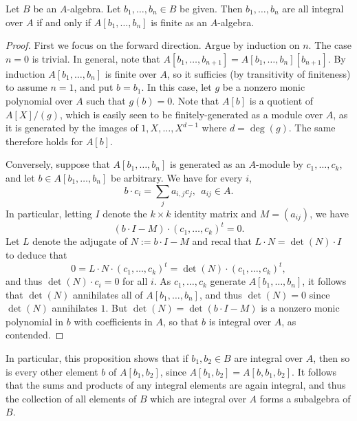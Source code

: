 \begin{proposition}
  Let $B$ be an $A$-algebra.
  Let $b_{1},\ldots,b_{n} \in B$ be given.
  Then $b_{1},\ldots,b_{n}$ are all integral over $A$ if and only if $A[b_{1},\ldots,b_{n}]$ is finite as an $A$-algebra.
\end{proposition}
\begin{proof}
  First we focus on the forward direction.
  Argue by induction on $n$.
  The case $n = 0$ is trivial.
  In general, note that $A[b_{1},\ldots,b_{n+1}] = A[b_{1},\ldots,b_{n}][b_{n+1}]$.
  By induction $A[b_{1},\ldots,b_{n}]$ is finite over $A$, so it sufficies (by transitivity of finiteness) to assume $n = 1$, and put $b = b_{1}$.
  In this case, let $g$ be a nonzero monic polynomial over $A$ such that $g(b) = 0$.
  Note that $A[b]$ is a quotient of $A[X]/(g)$, which is easily seen to be finitely-generated as a module over $A$, as it is generated by the images of $1,X,\ldots,X^{d-1}$ where $d = \deg(g)$.
  The same therefore holds for $A[b]$.

  Conversely, suppose that $A[b_{1},\ldots,b_{n}]$ is generated as an $A$-module by $c_{1},\ldots,c_{k}$, and let $b \in A[b_{1},\ldots,b_{n}]$ be arbitrary.
  We have for every $i$,
  \[ b \cdot c_{i} = \sum_{j} a_{i,j} c_{j}, \ \ a_{ij} \in A. \]
  In particular, letting $I$ denote the $k \times k$ identity matrix and $M = (a_{ij})$, we have
  \[ (b \cdot I - M) \cdot (c_{1},\ldots,c_{k})^{t} = 0. \]
  Let $L$ denote the adjugate of $N := b \cdot I - M$ and recal that $L \cdot N = \det(N) \cdot I$ to deduce that
  \[ 0 = L \cdot N \cdot (c_{1},\ldots,c_{k})^{t} = \det(N) \cdot (c_{1},\ldots,c_{k})^{t}, \]
  and thus $\det(N) \cdot c_{i} = 0$ for all $i$.
  As $c_{1},\ldots,c_{k}$ generate $A[b_{1},\ldots,b_{n}]$, it follows that $\det(N)$ annihilates all of $A[b_{1},\ldots,b_{n}]$, and thus $\det(N) = 0$ since $\det(N)$ annihilates $1$.
  But $\det(N) = \det(b \cdot I - M)$ is a nonzero monic polynomial in $b$ with coefficients in $A$, so that $b$ is integral over $A$, as contended.
\end{proof}

In particular, this proposition shows that if $b_{1},b_{2} \in B$ are integral over $A$, then so is every other element $b$ of $A[b_{1},b_{2}]$, since $A[b_{1},b_{2}] = A[b,b_{1},b_{2}]$.
It follows that the sums and products of any integral elements are again integral, and thus the collection of all elements of $B$ which are integral over $A$ forms a subalgebra of $B$.

